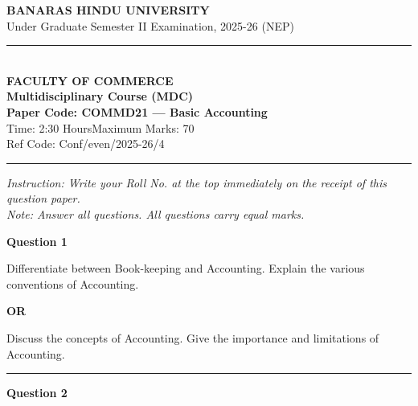 \documentclass[11pt,a4paper]{article}
\begin{document}
\begin{center}
  {\large\bfseries BANARAS HINDU UNIVERSITY}\\[2pt]
  {\normalsize Under Graduate Semester II Examination, 2025-26 (NEP)}\\[6pt]
  \rule{0.8\linewidth}{0.5pt}\\[6pt]
  {\large\bfseries FACULTY OF COMMERCE}\\[4pt]
  {\large\bfseries Multidisciplinary Course (MDC)}\\[4pt]
  {\large\bfseries Paper Code: COMMD21 --- Basic Accounting}\\[4pt]
  {\normalsize Time: 2:30 Hours\hfill Maximum Marks: 70}\\[2pt]
  {\small Ref Code: Conf/even/2025-26/4}
\end{center}

\rule{\linewidth}{0.4pt}\smallskip



\noindent   \textit{Instruction: Write your Roll No. at the top immediately on the receipt of this question paper.}\\[2pt]



\noindent   \textit{Note: Answer all questions. All questions carry equal marks.}
\bigskip




\noindent   \textbf{Question 1}

\begin{parts}
  \item Differentiate between Book-keeping and Accounting. Explain the various conventions of Accounting.
\end{parts}


\begin{center}   \textbf{OR}\end{center}

Discuss the concepts of Accounting. Give the importance and limitations of Accounting.

\medskip\rule{\linewidth}{0.2pt}\medskip




\noindent   \textbf{Question 2}
\end{document}
